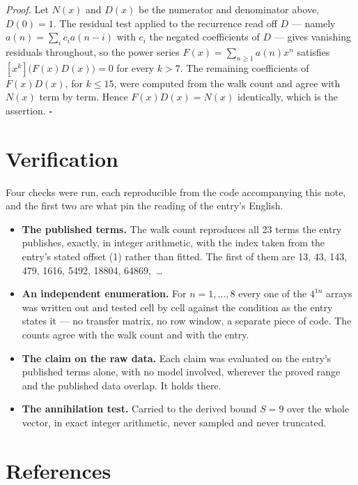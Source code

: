 \documentclass[11pt]{article}
\theoremstyle{definition}
\begin{document}
{\itshape Proof.} Let $N(x)$ and $D(x)$ be the numerator and denominator above, $D(0)=1$. The residual test applied to the recurrence read off $D$ --- namely $a(n) = \sum_i c_i a(n-i)$ with $c_i$ the negated coefficients of $D$ --- gives vanishing residuals throughout, so the power series $F(x)=\sum_{n\ge 1}a(n)x^n$ satisfies $[x^k]\bigl(F(x)D(x)\bigr) = 0$ for every $k > 7$. The remaining coefficients of $F(x)D(x)$, for $k \le 15$, were computed from the walk count and agree with $N(x)$ term by term. Hence $F(x)D(x) = N(x)$ identically, which is the assertion. $\square$

\section{Verification}

Four checks were run, each reproducible from the code accompanying this note, and the first two are what pin the reading of the entry's English.

\begin{itemize}

\item {\bfseries The published terms.} The walk count reproduces all 23 terms the entry publishes, exactly, in integer arithmetic, with the index taken from the entry's stated offset (1) rather than fitted. The first of them are 13, 43, 143, 479, 1616, 5492, 18804, 64869,~\dots

\item {\bfseries An independent enumeration.} For $n = 1,\dots,8$ every one of the $4^{1n}$ arrays was written out and tested cell by cell against the condition as the entry states it --- no transfer matrix, no row window, a separate piece of code. The counts agree with the walk count and with the entry.

\item {\bfseries The claim on the raw data.} Each claim was evaluated on the entry's published terms alone, with no model involved, wherever the proved range and the published data overlap. It holds there.

\item {\bfseries The annihilation test.} Carried to the derived bound $S = 9$ over the whole vector, in exact integer arithmetic, never sampled and never truncated.

\end{itemize}

\section{References}
\end{document}
